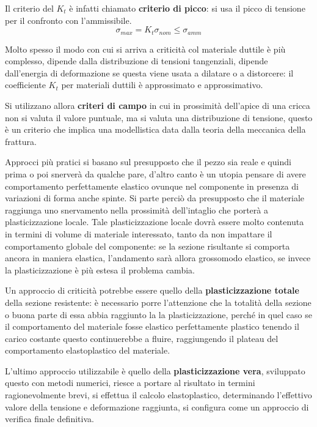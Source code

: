 \documentclass{article}
\begin{document}
\begin{adjustwidth}{2in}{}
		Il criterio del $K_t$ è infatti chiamato \textbf{criterio di picco}: si usa il picco di tensione per il confronto con l'ammissibile. 
		\[\sigma_{max} = K_t\sigma_{nom}\leq\sigma_{amm}\]
		
		Molto spesso il modo con cui si arriva a criticità col materiale duttile è più complesso, dipende dalla distribuzione di tensioni tangenziali, dipende dall'energia di deformazione se questa viene usata a dilatare o a distorcere: il coefficiente $K_t$ per materiali duttili è approssimato e approssimativo. 
		
		Si utilizzano allora \textbf{criteri di campo} in cui in prossimità dell'apice di una cricca non si valuta il valore puntuale, ma si valuta una distribuzione di tensione, questo è un criterio che implica una modellistica data dalla teoria della meccanica della frattura. \newline 
		
		Approcci più pratici si basano sul presupposto che il pezzo sia reale e quindi prima o poi snerverà da qualche pare, d'altro canto è un utopia pensare di avere comportamento perfettamente elastico ovunque nel componente in presenza di variazioni di forma anche spinte. Si parte perciò da presupposto che il materiale raggiunga uno snervamento nella prossimità dell'intaglio che porterà a plasticizzazione locale. Tale plasticizzazione locale dovrà essere molto contenuta in termini di volume di materiale interessato, tanto da non impattare il comportamento globale del componente: se la sezione risultante si comporta ancora in maniera elastica, l'andamento sarà allora grossomodo elastico, se invece la plasticizzazione è più estesa il problema cambia. \newline 
		
		Un approccio di criticità potrebbe essere quello della \textbf{plasticizzazione totale} della sezione resistente: è necessario porre l'attenzione che la totalità della sezione o buona parte di essa abbia raggiunto la la plasticizzazione, perché in quel caso se il comportamento del materiale fosse elastico perfettamente plastico tenendo il carico costante questo continuerebbe a fluire, raggiungendo il plateau del comportamento elastoplastico del materiale. \newline 
		
		L'ultimo approccio utilizzabile è quello della \textbf{plasticizzazione vera}, sviluppato questo con metodi numerici, riesce a portare al risultato in termini ragionevolmente brevi, si effettua il calcolo elastoplastico, determinando l’effettivo valore della tensione e deformazione raggiunta, si configura come un approccio di verifica finale definitiva. \newline 
		

\end{adjustwidth}
\end{document}
